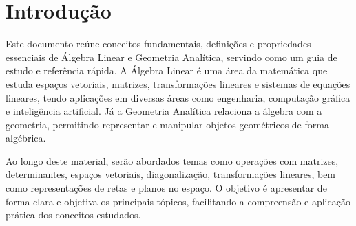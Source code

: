 \pagestyle{geral}
\section{Introdução}
\justifying\indent

Este documento reúne conceitos fundamentais, definições e propriedades essenciais de Álgebra Linear e Geometria Analítica, servindo como um guia de estudo e referência rápida. A Álgebra Linear é uma área da matemática que estuda espaços vetoriais, matrizes, transformações lineares e sistemas de equações lineares, tendo aplicações em diversas áreas como engenharia, computação gráfica e inteligência artificial. Já a Geometria Analítica relaciona a álgebra com a geometria, permitindo representar e manipular objetos geométricos de forma algébrica.

Ao longo deste material, serão abordados temas como operações com matrizes, determinantes, espaços vetoriais, diagonalização, transformações lineares, bem como representações de retas e planos no espaço. O objetivo é apresentar de forma clara e objetiva os principais tópicos, facilitando a compreensão e aplicação prática dos conceitos estudados.

